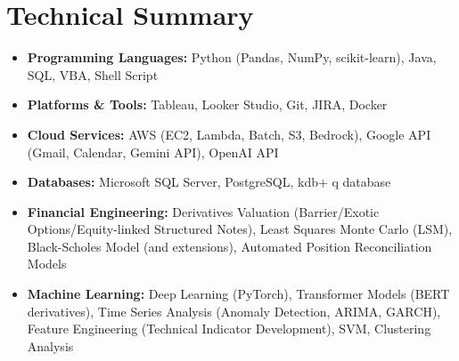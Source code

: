 \documentclass[uplatex,a4j,10.5pt,dvipdfmx]{jsarticle}
\begin{document}
\section{Technical Summary}
\begin{itemize}
	\item \textbf{Programming Languages:} Python (Pandas, NumPy, scikit-learn), Java, SQL, VBA, Shell Script
	\item \textbf{Platforms \& Tools:} Tableau, Looker Studio, Git, JIRA, Docker
	\item \textbf{Cloud Services:} AWS (EC2, Lambda, Batch, S3, Bedrock), Google API (Gmail, Calendar, Gemini API), OpenAI API
	\item \textbf{Databases:} Microsoft SQL Server, PostgreSQL, kdb+ q database
	\item \textbf{Financial Engineering:} Derivatives Valuation (Barrier/Exotic Options/Equity-linked Structured Notes), Least Squares Monte Carlo (LSM), Black-Scholes Model (and extensions), Automated Position Reconciliation Models
	\item \textbf{Machine Learning:} Deep Learning (PyTorch), Transformer Models (BERT derivatives), Time Series Analysis (Anomaly Detection, ARIMA, GARCH), Feature Engineering (Technical Indicator Development), SVM, Clustering Analysis
\end{itemize}
\end{document}
